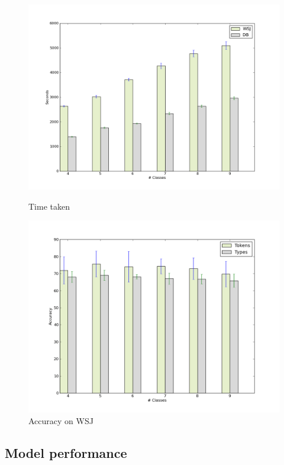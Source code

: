\documentclass{article}
\begin{document}
\begin{figure}[ht]
\begin{minipage}[b]{0.5\linewidth}\centering
\includegraphics[scale=0.25]{fig/time}
\caption{\label{timeFig}Time taken}
\end{minipage}
\begin{minipage}[b]{0.5\linewidth}\centering
\includegraphics[scale=0.25]{fig/accu}
\caption{\label{accuFig}Accuracy on WSJ}
\end{minipage}
\end{figure}

\subsection{Model performance}
\end{document}
